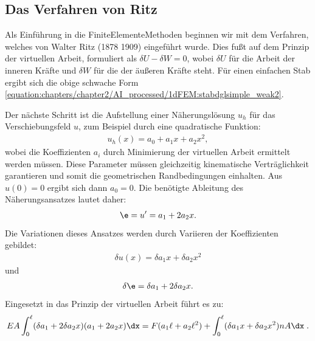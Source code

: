\documentclass[letterpaper,10pt,german]{jupyterBook}
\begin{document}
\subsection{Das Verfahren von Ritz}
\label{\detokenize{chapters/chapter2/1dFEM:das-verfahren-von-ritz}}
\sphinxAtStartPar
Als Einführung in die Finite\sphinxhyphen{}Elemente\sphinxhyphen{}Methoden beginnen wir mit dem Verfahren, welches von Walter Ritz (1878 \sphinxhyphen{} 1909) eingeführt wurde. Dies fußt auf dem Prinzip der virtuellen Arbeit, formuliert als \(\delta U − \delta W = 0\), wobei \(\delta U\) für die Arbeit der inneren Kräfte und \(\delta W\) für die der äußeren Kräfte steht. Für einen einfachen Stab ergibt sich die obige schwache Form \eqref{equation:chapters/chapter2/AI_processed/1dFEM:stabdglsimple_weak2}.

\sphinxAtStartPar
Der nächste Schritt ist die Aufstellung einer Näherungslösung \(u_h\) für das Verschiebungsfeld \(u\), zum Beispiel durch eine quadratische Funktion:
\begin{equation*}
\begin{split}u_h(x) = a_0 + a_1 x + a_2 x^2,\end{split}
\end{equation*}
\sphinxAtStartPar
wobei die Koeffizienten \(a_i\) durch Minimierung der virtuellen Arbeit ermittelt werden müssen. Diese Parameter müssen gleichzeitig kinematische Verträglichkeit garantieren und somit die geometrischen Randbedingungen einhalten. Aus \(u(0) = 0\) ergibt sich dann \(a_0 = 0\). Die benötigte Ableitung des Näherungsansatzes lautet daher:
\begin{equation*}
\begin{split}\e = u^{\prime} = a_1 + 2a_2 x.\end{split}
\end{equation*}
\sphinxAtStartPar
Die Variationen dieses Ansatzes werden durch Variieren der Koeffizienten gebildet:
\begin{equation*}
\begin{split}\delta u(x) = \delta a_1 x + \delta a_2 x^2\end{split}
\end{equation*}
\sphinxAtStartPar
und
\begin{equation*}
\begin{split}\delta \e= \delta a_1 + 2 \delta a_2 x.\end{split}
\end{equation*}
\sphinxAtStartPar
Eingesetzt in das Prinzip der virtuellen Arbeit führt es zu:
\begin{equation*}
\begin{split}EA \int_0^{\ell} (\delta a_1 + 2 \delta a_2 x) (a_1 +2 a_2 x) \dx = F (a_1 \ell +a_2 \ell^2) + \int_0^{\ell} (\delta a_1 x + \delta a_2 x^2) n A \dx \; .\end{split}
\end{equation*}
\end{document}
